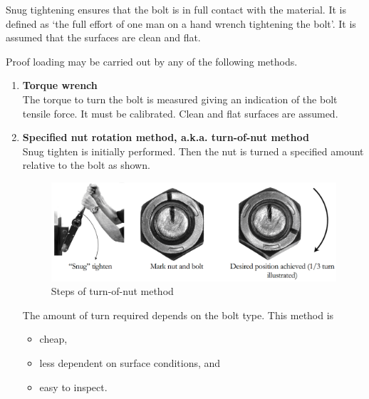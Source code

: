 Snug tightening ensures that the bolt is in full contact with the material. It is defined as `the full effort of one man on a hand wrench tightening the bolt'. It is assumed that the surfaces are clean and flat.

Proof loading may be carried out by any of the following methods.
\begin{enumerate}
\item \textbf{Torque wrench}\\The torque to turn the bolt is measured  giving an indication of the bolt tensile force. It must be calibrated. Clean and flat surfaces are assumed.
\item \textbf{Specified nut rotation method, a.k.a. turn-of-nut method}\\Snug tighten is initially performed. Then the nut is turned a specified amount relative to the bolt as shown.
\begin{figure}[H]
\centering\includegraphics[scale=.25]{PIC/CH06/TON}\caption{Steps of turn-of-nut method}
\end{figure}

The amount of turn required depends on the bolt type. This method is
\begin{itemize}
\item cheap,
\item less dependent on surface conditions, and
\item easy to inspect.
\end{itemize}


\end{enumerate}
